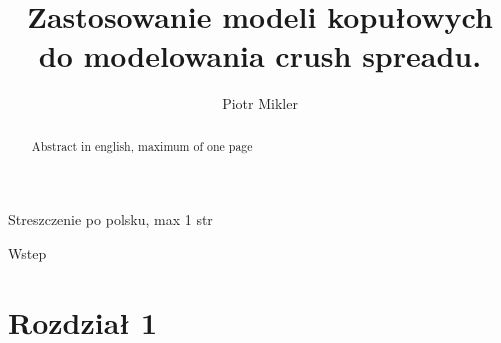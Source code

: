 \documentclass[mfu, pdftex]{mgrwms}
\begin{document}
\title{\LARGE Zastosowanie modeli kopułowych do modelowania crush spreadu.}
\author{Piotr Mikler}
\maketitle
{}

\newtheorem{thm}{\indent Twierdzenie}[chapter]
\newtheorem{lemma}[thm]{\indent Lemat}
\newtheorem{cor}[thm]{\indent Wniosek}
\newtheorem{obs}[thm]{\indent Obserwacja}
\newtheorem{uw}[thm]{\indent Uwaga}
\newtheorem{df}[thm]{Definicja}
\newcommand{\E}{\mathbb{E}}
\newcommand{\R}{\mathbb{R}}
\newcommand{\Pra}{\mathbb{Pra}}

\makeatletter
\newcommand*{\defeq}{\mathrel{\rlap{%
                     \raisebox{0.3ex}{$\m@th\cdot$}}%
                     \raisebox{-0.3ex}{$\m@th\cdot$}}%
                     =}
\let\c@table\c@figure
\makeatother

\tableofcontents
\begin{streszczenie}
Streszczenie po polsku, max 1 str
\end{streszczenie}

\begin{abstract}
Abstract in english, maximum of one page
\end{abstract}


\begin{wstep}    %
Wstep

\end{wstep}

\chapter{Rozdział 1}
\mgrclosechapter

 
\end{document}
